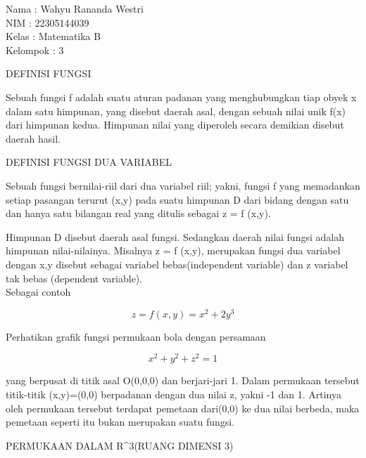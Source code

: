 \documentclass[a4paper,10pt]{article}
\begin{document}
\begin{eulernotebook}
\begin{eulercomment}
Nama     : Wahyu Rananda Westri\\
NIM      : 22305144039\\
Kelas    : Matematika B\\
Kelompok : 3

\begin{eulercomment}
\begin{eulercomment}
DEFINISI FUNGSI

Sebuah fungsi f adalah suatu aturan padanan yang menghubungkan tiap
obyek x dalam satu himpunan, yang disebut daerah asal, dengan sebuah
nilai unik f(x) dari himpunan kedua.  Himpunan nilai yang diperoleh
secara demikian disebut daerah hasil.

DEFINISI FUNGSI DUA VARIABEL

Sebuah fungsi bernilai-riil dari dua variabel riil; yakni, fungsi f
yang memadankan setiap pasangan terurut (x,y) pada suatu himpunan D
dari bidang dengan satu dan hanya satu bilangan real yang ditulis
sebagai z = f (x,y).

Himpunan D disebut daerah asal fungsi. Sedangkan daerah nilai fungsi
adalah himpunan nilai-nilainya. Misalnya z = f (x,y), merupakan fungsi
dua variabel dengan x,y disebut sebagai variabel bebas(independent
variable) dan z variabel tak bebas (dependent variable).\\
Sebagai contoh\\
\end{eulercomment}
\begin{eulerformula}
\[
z=f(x,y)=x^2+2y^3
\]
\end{eulerformula}
\begin{eulercomment}
Perhatikan grafik fungsi permukaan bola dengan persamaan\\
\end{eulercomment}
\begin{eulerformula}
\[
x^2+y^2+z^2=1
\]
\end{eulerformula}
\begin{eulercomment}
yang berpusat di titik asal O(0,0,0) dan berjari-jari 1. Dalam
permukaan tersebut titik-titik (x,y)=(0,0) berpadanan dengan dua nilai
z, yakni -1 dan 1.  Artinya oleh permukaan tersebut terdapat pemetaan
dari(0,0) ke dua nilai berbeda, maka pemetaan seperti itu bukan
merupakan suatu fungsi.

PERMUKAAN DALAM R\textasciicircum{}3(RUANG DIMENSI 3)


\end{eulercomment}
\end{eulercomment}
\end{eulercomment}
\end{eulernotebook}
\end{document}
